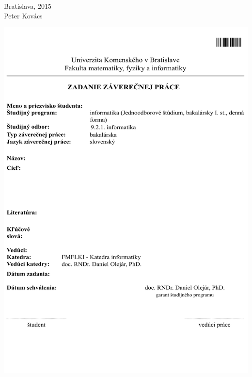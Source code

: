 \documentclass[12pt, oneside]{book}
\theoremstyle{definition} \newtheorem{defi}{Definícia}
\def\mfyear{2015}
\def\mfauthor{Peter Kovács}
\def\mfplacedate{Bratislava, \mfyear}
\begin{document}
\noindent \mfplacedate\\
\indent\mfauthor

\eject %





\newpage 
\thispagestyle{empty}
\hspace{-1cm}\includegraphics[width=1.2\textwidth]{images/zadanie}


\frontmatter

\newpage 
\thispagestyle{empty}
\end{document}
